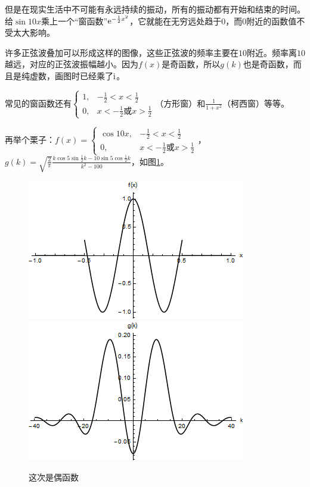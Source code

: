 但是在现实生活中不可能有永远持续的振动，所有的振动都有开始和结束的时间。给$\sin 10 x$乘上一个“窗函数”$\mathrm{e}^{-\frac{1}{2} x^2}$，它就能在无穷远处趋于$0$，而$0$附近的函数值不受太大影响。

许多正弦波叠加可以形成这样的图像，这些正弦波的频率主要在$10$附近。频率离$10$越远，对应的正弦波振幅越小。因为$f(x)$是奇函数，所以$g(k)$也是奇函数，而且是纯虚数，画图时已经乘了$\mathrm{i}$。

常见的窗函数还有$\begin{cases} 1, &-\frac{1}{2}<x<\frac{1}{2} \\ 0, &x<-\frac{1}{2} \text{或} x>\frac{1}{2} \end{cases}$（方形窗）和$\frac{1}{1+x^2}$（柯西窗）等等。

再举个栗子：$f(x)=\begin{cases} \cos 10 x, &-\frac{1}{2}<x<\frac{1}{2} \\ 0, &x<-\frac{1}{2} \text{或} x>\frac{1}{2} \end{cases}$，$g(k)=\sqrt{\frac{2}{\pi}} \frac{k \cos 5 \sin \frac{1}{2} k-10 \sin 5 \cos \frac{1}{2} k}{k^2-100}$，如图\ref{fig-block-sin10x}。
\begin{figure}[htb]
\centering
\includegraphics[scale=0.5]{fig/block-sin10x}
\includegraphics[scale=0.5]{fig/block-sin10x-g}
\caption{这次是偶函数}
\label{fig-block-sin10x}
\end{figure}

